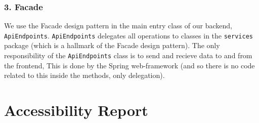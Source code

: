 \documentclass[fontsize=14pt]{article}
\def\code#1{\texttt{#1}}
\begin{document}
\subsubsection*{3. Facade}
We use the Facade design pattern in the main entry class of our backend, \code{ApiEndpoints}. \code{ApiEndpoints} delegates all operations to classes in the \code{services} package (which is a hallmark of the Facade design pattern). The only responsibility of the \code{ApiEndpoints} class is to send and recieve data to and from the frontend, This is done by the Spring web-framework (and so there is no code related to this inside the methods, only delegation).

\section*{Accessibility Report}
\end{document}
